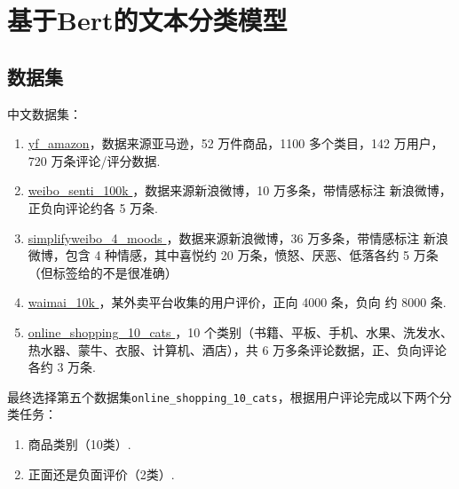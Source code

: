 \documentclass[
]{article}
\author{}
\date{}
\begin{document}
\hypertarget{ux57faux4e8ebertux7684ux6587ux672cux5206ux7c7bux6a21ux578b}{%
\section{基于Bert的文本分类模型}\label{ux57faux4e8ebertux7684ux6587ux672cux5206ux7c7bux6a21ux578b}}

\hypertarget{ux6570ux636eux96c6}{%
\subsection{数据集}\label{ux6570ux636eux96c6}}

中文数据集：

\begin{enumerate}
\def\labelenumi{\arabic{enumi}.}
\item
  \href{https://github.com/SophonPlus/ChineseNlpCorpus/blob/master/datasets/yf_amazon/intro.ipynb}{yf\_amazon}，数据来源亚马逊，52
  万件商品，1100 多个类目，142 万用户，720 万条评论/评分数据.
\item
  \href{https://github.com/SophonPlus/ChineseNlpCorpus/blob/master/datasets/weibo_senti_100k/intro.ipynb}{weibo\_senti\_100k
  }，数据来源新浪微博，10 万多条，带情感标注 新浪微博，正负向评论约各 5
  万条.
\item
  \href{https://github.com/SophonPlus/ChineseNlpCorpus/blob/master/datasets/simplifyweibo_4_moods/intro.ipynb}{simplifyweibo\_4\_moods
  }，数据来源新浪微博，36 万多条，带情感标注 新浪微博，包含 4
  种情感，其中喜悦约 20 万条，愤怒、厌恶、低落各约 5
  万条（但标签给的不是很准确）
\item
  \href{https://github.com/SophonPlus/ChineseNlpCorpus/blob/master/datasets/waimai_10k/intro.ipynb}{waimai\_10k
  }，某外卖平台收集的用户评价，正向 4000 条，负向 约 8000 条.
\item
  \href{https://github.com/SophonPlus/ChineseNlpCorpus/blob/master/datasets/online_shopping_10_cats/intro.ipynb}{online\_shopping\_10\_cats
  }，10
  个类别（书籍、平板、手机、水果、洗发水、热水器、蒙牛、衣服、计算机、酒店），共
  6 万多条评论数据，正、负向评论各约 3 万条.
\end{enumerate}

最终选择第五个数据集\texttt{online\_shopping\_10\_cats}，根据用户评论完成以下两个分类任务：

\begin{enumerate}
\def\labelenumi{\arabic{enumi}.}
\item
  商品类别（10类）.
\item
  正面还是负面评价（2类）.
\end{enumerate}
\end{document}
